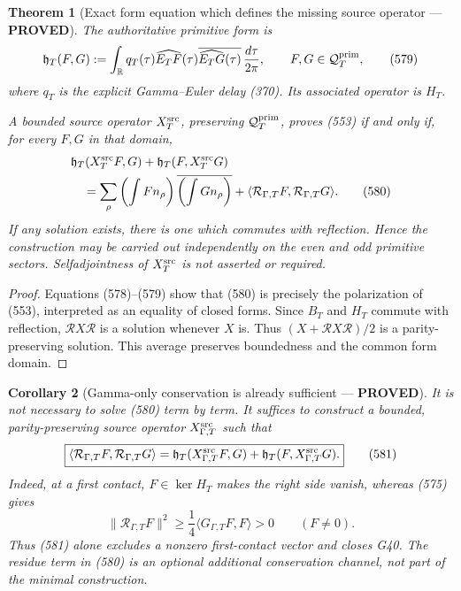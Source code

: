 \documentclass[11pt]{article}
\newtheorem{theorem}{Theorem}
\newtheorem{corollary}[theorem]{Corollary}
\newcommand{\PROVED}{\textcolor{green!45!black}{\textbf{PROVED}}}
\begin{document}
\begin{theorem}[Exact form equation which defines the missing source
operator --- \PROVED]
The authoritative primitive form is
\begin{equation}
 \mathfrak h_T(F,G):=
 \int_{\mathbb R}q_T(\tau)
 \widehat{E_TF}(\tau)
 \overline{\widehat{E_TG}(\tau)}
 \,\frac{d\tau}{2\pi},
 \qquad F,G\in\mathcal Q_T^{\rm prim},               \tag{579}
\end{equation}
where \(q_T\) is the explicit Gamma--Euler delay (370).  Its associated
operator is \(H_T\).

A bounded source operator \(X_T^{\rm src}\), preserving
\(\mathcal Q_T^{\rm prim}\), proves (553) if and only if, for every
\(F,G\) in that domain,
\begin{align}
 &\mathfrak h_T(X_T^{\rm src}F,G)
 +\mathfrak h_T(F,X_T^{\rm src}G)\notag\\
 &\quad=
 \sum_{\rho}
 \left(\int F n_\rho\right)
 \overline{\left(\int G n_\rho\right)}
 +\langle\mathcal R_{\Gamma,T}F,
          \mathcal R_{\Gamma,T}G\rangle .            \tag{580}
\end{align}
If any solution exists, there is one which commutes with reflection.
Hence the construction may be carried out independently on the even and
odd primitive sectors.  Selfadjointness of \(X_T^{\rm src}\) is not
asserted or required.
\end{theorem}

\begin{proof}
Equations (578)--(579) show that (580) is precisely the polarization of
(553), interpreted as an equality of closed forms.  Since \(B_T\) and
\(H_T\) commute with reflection, \(\mathcal RX\mathcal R\) is a solution
whenever \(X\) is.  Thus
\((X+\mathcal RX\mathcal R)/2\) is a parity-preserving solution.
This average preserves boundedness and the common form domain.
\end{proof}

\begin{corollary}[Gamma-only conservation is already sufficient ---
\PROVED]
It is not necessary to solve (580) term by term.  It suffices to construct
a bounded, parity-preserving source operator \(X_{\Gamma,T}^{\rm src}\)
such that
\begin{equation}
 \boxed{
 \langle\mathcal R_{\Gamma,T}F,\mathcal R_{\Gamma,T}G\rangle
 =\mathfrak h_T(X_{\Gamma,T}^{\rm src}F,G)
  +\mathfrak h_T(F,X_{\Gamma,T}^{\rm src}G).}        \tag{581}
\end{equation}
Indeed, at a first contact, \(F\in\ker H_T\) makes the right side vanish,
whereas (575) gives
\[
 \|\mathcal R_{\Gamma,T}F\|^2
 \ge\frac14\langle G_{\Gamma,T}F,F\rangle>0
 \qquad(F\ne0).
\]
Thus (581) alone excludes a nonzero first-contact vector and closes G40.
The residue term in (580) is an optional additional conservation channel,
not part of the minimal construction.
\end{corollary}
\end{document}
